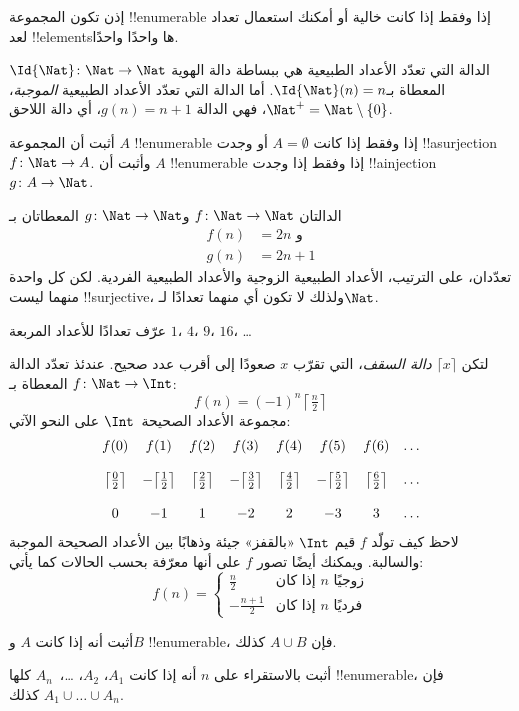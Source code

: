 \documentclass[../../../include/open-logic-section]{subfiles}
\begin{document}
\begin{explain}
إذن تكون المجموعة !!{enumerable} إذا وفقط إذا كانت خالية أو أمكنك
استعمال تعداد لعد !!{element}sها واحدًا واحدًا.
\end{explain}

\begin{ex}
الدالة التي تعدّد الأعداد الطبيعية هي ببساطة دالة الهوية
$\Id{\Nat} \colon \Nat \to \Nat$ المعطاة بـ$\Id{\Nat}(n) = n$. أما
الدالة التي تعدّد الأعداد الطبيعية \emph{الموجبة}، $\Nat^+ =
\Nat \setminus \{0\}$، فهي الدالة $g(n) = n + 1$، أي دالة اللاحق.
\end{ex}

\begin{prob}
أثبت أن المجموعة $A$ !!{enumerable} إذا وفقط إذا كانت $A = \emptyset$
أو وجدت !!a{surjection} $f\colon \Nat \to A$. وأثبت أن $A$
!!{enumerable} إذا وفقط إذا وجدت !!a{injection} $g\colon A \to \Nat$.
\end{prob}

\begin{ex}
الدالتان $f\colon \Nat \to \Nat$ و$g \colon \Nat \to \Nat$
المعطاتان بـ
\begin{align*}
  f(n) & = 2n \text{ و}\\
  g(n) & = 2n+1
\end{align*}
تعدّدان، على الترتيب، الأعداد الطبيعية الزوجية والأعداد الطبيعية
الفردية. لكن كل واحدة منهما ليست !!{surjective}، ولذلك لا تكون أي منهما
تعدادًا لـ$\Nat$.
\end{ex}

\begin{prob}
عرّف تعدادًا للأعداد المربعة $1$، $4$، $9$، $16$، \dots
\end{prob}

\begin{ex}
لتكن $\lceil x \rceil$ \emph{دالة السقف}، التي تقرّب $x$ صعودًا
إلى أقرب عدد صحيح. عندئذ تعدّد الدالة $f \colon \Nat \to \Int$
المعطاة بـ:
\[
  f(n) = (-1)^{n} \left\lceil\tfrac{n}{2}\right\rceil
\]
مجموعة الأعداد الصحيحة~$\Int$ على النحو الآتي:
\[
\begin{array}{c c c c c c c c}
f(0) & f(1) & f(2) & f(3) & f(4) & f(5) & f(6) & \dots \\ \\
\big\lceil \tfrac{0}{2} \big\rceil & -\big\lceil \tfrac{1}{2}\big\rceil &  \big\lceil \tfrac{2}{2} \big\rceil & -\big\lceil \tfrac{3}{2} \big\rceil & \big\lceil \tfrac{4}{2} \big\rceil  & -\big\lceil \tfrac{5}{2}\big\rceil & \big\lceil \tfrac{6}{2} \big\rceil & \dots \\ \\
0 & -1 & 1 & -2 & 2 & -3 & 3& \dots
\end{array}
\]
لاحظ كيف تولّد $f$ قيم $\Int$ «بالقفز» جيئة وذهابًا بين الأعداد
الصحيحة الموجبة والسالبة. ويمكنك أيضًا تصور $f$ على أنها معرّفة بحسب
الحالات كما يأتي:
\[
f(n) = \begin{cases}
  \frac{n}{2} & \text{إذا كان $n$ زوجيًا}\\
  -\frac{n+1}{2} & \text{إذا كان $n$ فرديًا}
  \end{cases}
\]
\end{ex}

\begin{prob}
أثبت أنه إذا كانت $A$ و$B$ !!{enumerable}، فإن $A \cup B$ كذلك.
\end{prob}

\begin{prob}
أثبت بالاستقراء على $n$ أنه إذا كانت $A_1$، $A_2$، \dots،~$A_n$
كلها !!{enumerable}، فإن $A_1 \cup \dots \cup A_n$ كذلك.
\end{prob}
\end{document}
